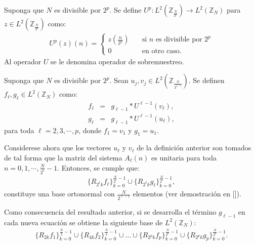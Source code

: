 \begin{definition}
Suponga que $N$ es divisible por $2^p$. Se define $U^p: L^2\left(\mathbb{Z}_{\frac{N}{2^p}}\right)\rightarrow L^2\left(\mathbb{Z}_N\right)$ para $z\in L^2\left(\mathbb{Z}_{\frac{N}{2^p}}\right)$ como:
\begin{eqnarray}
U^p(z)(n)=\left\{\begin{array}{ll}
z\left(\frac{n}{2^p}\right)&\quad\mbox{si $n$ es divisible por $2^p$}\\
0&\quad\mbox{en otro caso.}
\end{array}\right.\nonumber
\end{eqnarray}
Al operador $U$ se le denomina operador de sobremuestreo.
\end{definition}

\begin{definition}
Suponga que $N$ es divisible por $2^p$. Sean $u_j,v_j\in L^2\left(\mathbb{Z}_{\frac{N}{2^{j-1}}}\right)$. Se definen $f_{\ell},g_{\ell}\in L^2\left(\mathbb{Z}_N\right)$ como:
\begin{eqnarray}
f_{\ell}&=&g_{\ell-1}\ast U^{\ell-1}(v_{\ell}),\nonumber\\
g_{\ell}&=&g_{\ell-1}\ast U^{\ell-1}(u_{\ell}),\nonumber
\end{eqnarray}
para toda $\ell=2,3,\cdots,p$, donde $f_1=v_1$ y $g_1=u_1$.
\end{definition}

\par Considerese ahora que los vectores $u_{\ell}$ y $v_{\ell}$ de la definici\'on anterior son tomados de tal forma que la matriz del sistema $A_{\ell}(n)$ es unitaria para toda $n=0,1,\cdots,\frac{N}{2^{\ell}}-1$. Entonces, se cumple que:
\begin{eqnarray}
\{R_{2^{\ell}k}f_{\ell}\}_{k=0}^{\frac{N}{2^{\ell}}-1}\cup\{R_{2^{\ell}k}g_{\ell}\}_{k=0}^{\frac{N}{2^{\ell}}-1},\nonumber
\end{eqnarray}
constituye una base ortonormal con $\frac{N}{2^{\ell-1}}$ elementos (ver demostraci\'on en [\textcolor{cyan}{\cite{8}}]).

\par Como consecuencia del resultado anterior, si se desarrolla el t\'ermino $g_{\ell-1}$ en cada nueva ecuaci\'on se obtiene la siguiente base de $L^2\left(\mathbb{Z}_N\right)$:
\begin{eqnarray}
\{R_{2k}f_1\}_{k=0}^{\frac{N}{2}-1}\cup\{R_{4k}f_2\}_{k=0}^{\frac{N}{4}-1}\cup ...\cup\{R_{2^{p}k}f_{p}\}_{k=0}^{\frac{N}{2^{p}}-1}\cup\{R_{2^{p}k}g_{p}\}_{k=0}^{\frac{N}{2^{p}}-1}.\nonumber
\end{eqnarray}

